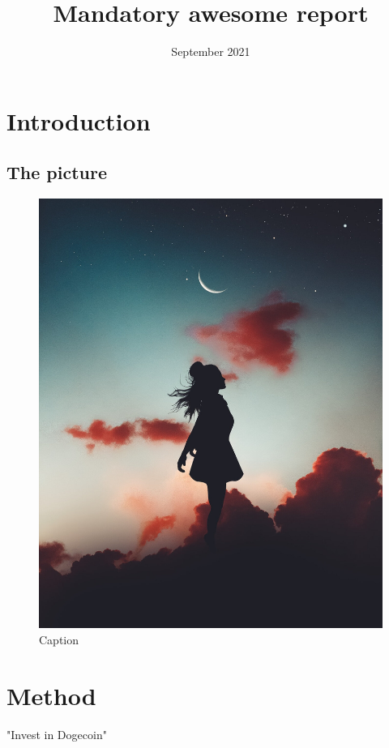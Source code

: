 \documentclass{article}
\title{Mandatory awesome report}
\author{}
\date{September 2021}
\begin{document}
\maketitle

\tableofcontents

\section{Introduction}
\subsection{The picture}
\begin{figure}
    \centering
    \includegraphics[width=\textwidth]{pic.jpg}
    \caption{Caption}
    \label{fig:my_label}
\end{figure}


\section{Method}
"Invest in Dogecoin" \textcite{Graham2005}
\end{document}
